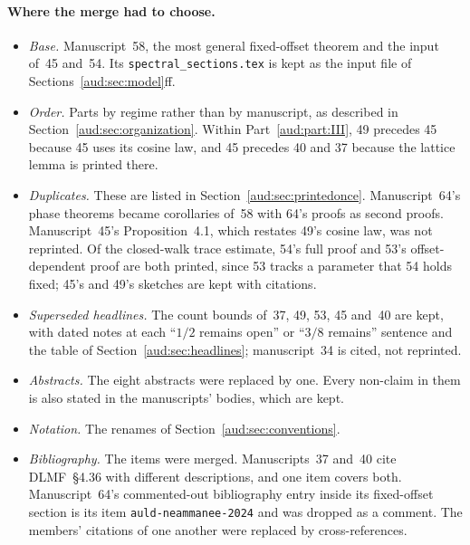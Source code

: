 \documentclass[11pt,a4paper]{article}
\numberwithin{equation}{section}
\begin{document}
\paragraph{Where the merge had to choose.}
\begin{itemize}
\item \emph{Base.} Manuscript~58, the most general fixed-offset theorem and the input of~45 and~54. Its \texttt{spectral\_sections.tex} is kept as the input file of Sections~\ref{aud:sec:model}ff.
\item \emph{Order.} Parts by regime rather than by manuscript, as described in Section~\ref{aud:sec:organization}. Within Part~\ref{aud:part:III}, 49 precedes 45 because 45 uses its cosine law, and 45 precedes 40 and 37 because the lattice lemma is printed there.
\item \emph{Duplicates.} These are listed in Section~\ref{aud:sec:printedonce}. Manuscript~64's phase theorems became corollaries of~58 with 64's proofs as second proofs. Manuscript~45's Proposition~4.1, which restates 49's cosine law, was not reprinted. Of the closed-walk trace estimate, 54's full proof and 53's offset-dependent proof are both printed, since 53 tracks a parameter that 54 holds fixed; 45's and 49's sketches are kept with citations.
\item \emph{Superseded headlines.} The count bounds of~37, 49, 53, 45 and~40 are kept, with dated notes at each ``$1/2$ remains open'' or ``$3/8$ remains'' sentence and the table of Section~\ref{aud:sec:headlines}; manuscript~34 is cited, not reprinted.
\item \emph{Abstracts.} The eight abstracts were replaced by one. Every non-claim in them is also stated in the manuscripts' bodies, which are kept.
\item \emph{Notation.} The renames of Section~\ref{aud:sec:conventions}.
\item \emph{Bibliography.} The items were merged. Manuscripts~37 and~40 cite DLMF~\S4.36 with different descriptions, and one item covers both. Manuscript~64's commented-out bibliography entry inside its fixed-offset section is its item \texttt{auld-neammanee-2024} and was dropped as a comment. The members' citations of one another were replaced by cross-references.
\end{itemize}
\end{document}
